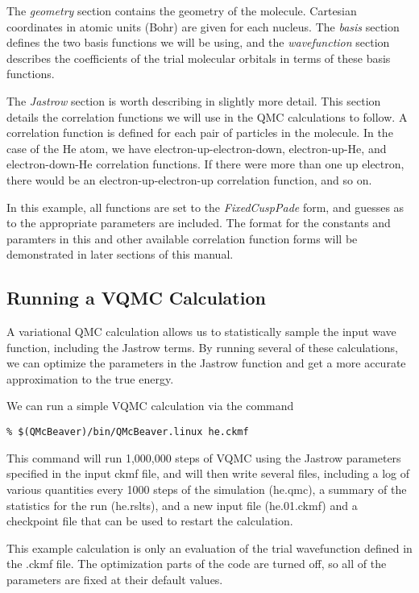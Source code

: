 \documentclass[11pt]{article}
\begin{document}
The \emph{geometry} section contains the geometry of the molecule.
Cartesian coordinates in atomic units (Bohr) are given for each nucleus.
The \emph{basis} section defines the two basis functions we will be
using, and the \emph{wavefunction} section describes the coefficients
of the trial molecular orbitals in terms of these basis functions.

The \emph{Jastrow} section is worth describing in slightly more
detail. This section details the correlation functions we will use in
the QMC calculations to follow.  A correlation function is defined for
each pair of particles in the molecule.  In the case of the He atom,
we have electron-up-electron-down, electron-up-He, and
electron-down-He correlation functions.  If there were more than one
up electron, there would be an electron-up-electron-up correlation
function, and so on.   

In this example, all functions are set to the \emph{FixedCuspPade}
form, and guesses as to the appropriate parameters are included. 
The format for the constants and paramters in this and other available
correlation function forms will be demonstrated in later sections of
this manual.

\subsection{Running a VQMC Calculation}
A variational QMC calculation allows us to statistically sample the
input wave function, including the Jastrow terms. By running several
of these calculations, we can optimize the parameters in the Jastrow
function and get a more accurate approximation to the true energy.

We can run a simple VQMC calculation via the command
\begin{verbatim}
% $(QMcBeaver)/bin/QMcBeaver.linux he.ckmf
\end{verbatim}

This command will run 1,000,000 steps of VQMC using the Jastrow
parameters specified in the input ckmf file, and will then write
several files, including a log of various quantities every 1000 steps
of the simulation (he.qmc), a summary of the statistics for the run
(he.rslts), and a new input file (he.01.ckmf) and a checkpoint file
that can be used to restart the calculation.

This example calculation is only an evaluation of the trial
wavefunction defined in the .ckmf file.  The optimization parts of the
code are turned off, so all of the parameters are fixed at their
default values.  
\end{document}
